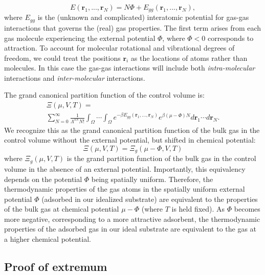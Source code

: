 \documentclass[twoside,twocolumn,9pt]{article}
\newcommand{\rvec}{\mathbf{r}}
\newcommand\V{\Phi}
\begin{document}
\begin{equation} E(\rvec_1,...,\rvec_N) = N\V +
E_{gg}(\rvec_1,...,\rvec_N),
\end{equation}
where $E_{gg}$ is the (unknown and complicated) interatomic potential for
gas-gas interactions that governs the (real) gas properties. The first term
arises from each gas molecule experiencing the external potential $\V$, where
$\V < 0$ corresponds to attraction. To account for molecular rotational and
vibrational degrees of freedom, we could treat the positions $\rvec_i$ as the
locations of atoms rather than molecules. In this case the gas-gas interactions
will include both \emph{intra-molecular} interactions and
\emph{inter-molecular} interactions.

The grand canonical partition function of the control volume is:
\begin{multline}
    \Xi(\mu, V, T)= \\ \displaystyle \sum_{N=0}^\infty \frac{1}{\Lambda^{3N}N!} \int_{\Omega} \cdots \int_{\Omega} e^{-\beta E_{gg}(\rvec_1, ..., \rvec_N)} e^{\beta (\mu - \V) N} d\rvec_1 \cdots d\rvec_N.
    \label{eq:gcpf}
\end{multline}
We recognize this as the grand canonical partition function of the bulk gas in
the control volume without the external potential, but shifted in chemical
potential:
\begin{equation}
    \Xi(\mu, V, T)=\Xi_g(\mu - \V, V, T)
    \label{eq:xi_vs_xi0}
\end{equation}
where $\Xi_g(\mu, V, T)$ is the grand partition function of the bulk
gas in the control volume in the absence of an external potential. Importantly,
this equivalency depends on the potential $\V$ being spatially uniform.
Therefore, the thermodynamic properties of the gas atoms in the spatially
uniform external potential $\V$ (adsorbed in our idealized substrate)
are equivalent to the properties of the bulk gas at chemical potential $\mu-\V$
(where $T$ is held fixed). As $\V$ becomes more negative, corresponding to a
more attractive adsorbent, the thermodynamic properties of the adsorbed gas in
our ideal substrate are equivalent to the gas at a higher chemical potential.

\subsection{Proof of extremum}\label{sec:proof-extremum}
\end{document}
